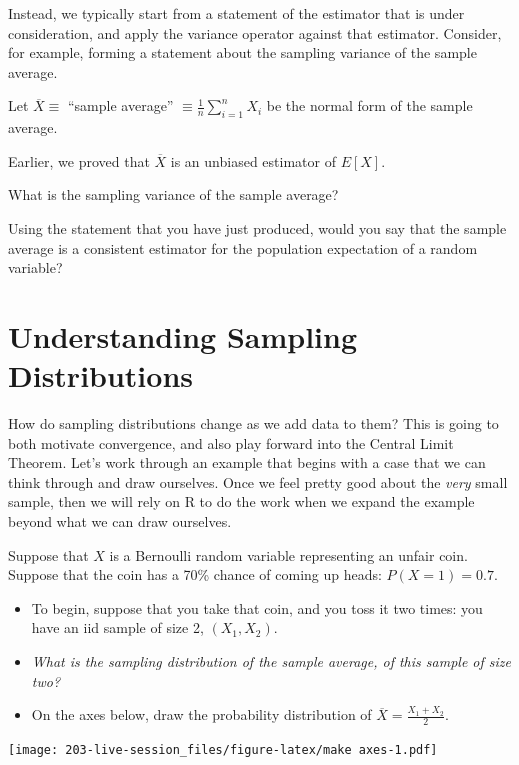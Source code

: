 \documentclass[
]{book}
\providecommand{\tightlist}{%
  \setlength{\itemsep}{0pt}\setlength{\parskip}{0pt}}
\theoremstyle{definition}
\theoremstyle{definition}
\theoremstyle{definition}
\theoremstyle{definition}
\theoremstyle{remark}
\begin{document}
Instead, we typically start from a statement of the estimator that is under consideration, and apply the variance operator against that estimator. Consider, for example, forming a statement about the sampling variance of the sample average.

Let \(\overline{X} \equiv\) ``sample average'' \(\equiv \frac{1}{n}\sum_{i=1}^{n}X_{i}\) be the normal form of the sample average.

Earlier, we proved that \(\overline{X}\) is an unbiased estimator of \(E[X]\).

What is the sampling variance of the sample average?

\vspace{20cm}

Using the statement that you have just produced, would you say that the sample average is a consistent estimator for the population expectation of a random variable?

\hypertarget{understanding-sampling-distributions}{%
\section{Understanding Sampling Distributions}\label{understanding-sampling-distributions}}

How do sampling distributions change as we add data to them? This is going to both motivate convergence, and also play forward into the Central Limit Theorem.
Let's work through an example that begins with a case that we can think through and draw ourselves. Once we feel pretty good about the \emph{very} small sample, then we will rely on R to do the work when we expand the example beyond what we can draw ourselves.

Suppose that \(X\) is a Bernoulli random variable representing an unfair coin. Suppose that the coin has a 70\% chance of coming up heads: \(P(X=1) = 0.7\).

\begin{itemize}
\tightlist
\item
  To begin, suppose that you take that coin, and you toss it two times: you have an iid sample of size 2, \((X_1,X_2)\).
\item
  \emph{What is the sampling distribution of the sample average, of this sample of size two?}
\item
  On the axes below, draw the probability distribution of \(\overline X = \frac{X_1+X_2}{2}\).
\end{itemize}

\texttt{[image: 203-live-session\_files/figure-latex/make axes-1.pdf]}
\end{document}
